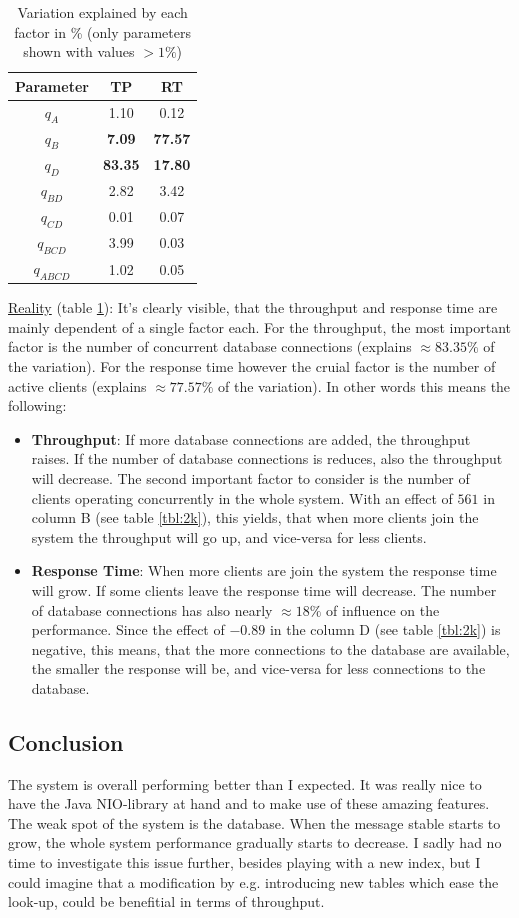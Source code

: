 \documentclass[11pt]{article}
\begin{document}
\begin{table}
\centering
\caption{Variation explained by each factor in \% (only parameters shown with values $>1\%$)}
\label{tbl:2k_percentages}
\begin{tabular}{ccc}
	Parameter & TP & RT \\ \hline
	$q_{A}$ & 1.10 & 0.12 \\
	$q_{B}$ & \textbf{7.09} & \textbf{77.57}  \\
	$q_{D}$ & \textbf{83.35} & \textbf{17.80} \\
	$q_{BD}$ & 2.82 & 3.42 \\
	$q_{CD}$ & 0.01 & 0.07  \\
	$q_{BCD}$ & 3.99 & 0.03  \\
	$q_{ABCD}$ & 1.02 & 0.05  \\
\end{tabular}
\end{table}
\underline{Reality} (table \ref{tbl:2k_percentages}): It's clearly visible, that the throughput and response time are mainly dependent of a single factor each. For the throughput, the most important factor is the number of concurrent database connections (explains $\approx83.35\%$ of the variation). For the response time however the cruial factor is the number of active clients (explains $\approx77.57\%$ of the variation). In other words this means the following:
\begin{itemize}
	\item \textbf{Throughput}: If more database connections are added, the throughput raises. If the number of database connections is reduces, also the throughput will decrease. The second important factor to consider is the number of clients operating concurrently in the whole system. With an effect of $561$ in column B (see table \ref{tbl:2k}), this yields, that when more clients join the system the throughput will go up, and vice-versa for less clients.
	\item \textbf{Response Time}: When more clients are join the system the response time will grow. If some clients leave the response time will decrease. The number of database connections has also nearly $\approx18\%$ of influence on the performance. Since the effect of $-0.89$ in the column D (see table \ref{tbl:2k}) is negative, this means, that the more connections to the database are available, the smaller the response will be, and vice-versa for less connections to the database.
\end{itemize}
\subsection{Conclusion}\label{sec:conclusion}
The system is overall performing better than I expected. It was really nice to have the Java NIO-library at hand and to make use of these amazing features. The weak spot of the system is the database. When the message stable starts to grow, the whole system performance gradually starts to decrease. I sadly had no time to investigate this issue further, besides playing with a new index, but I could imagine that a modification by e.g. introducing new tables which ease the look-up, could be benefitial in terms of throughput.
\end{document}
